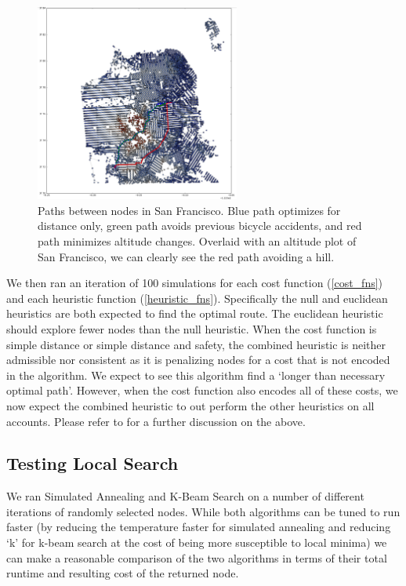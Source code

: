 \documentclass[11pt]{article}
\begin{document}
\begin{figure}
\center
\includegraphics[width=0.6\textwidth]{../images/sf_new_plot_2.png}
\caption{Paths between nodes in San Francisco. Blue path optimizes for distance only, green path avoids previous bicycle accidents, and red path minimizes altitude changes. Overlaid with an altitude plot of San Francisco, we can clearly see the red path avoiding a hill.}
\label{fig:connected_san_fran}
\end{figure}

\par
We then ran an iteration of 100 simulations for each cost function (\ref{cost_fns}) and each heuristic function (\ref{heuristic_fns}). Specifically the null and euclidean heuristics are both expected to find the optimal route. The euclidean heuristic should explore fewer nodes than the null heuristic. When the cost function is simple distance or simple distance and safety, the combined heuristic is neither admissible nor consistent as it is penalizing nodes for a cost that is not encoded in the algorithm. We expect to see this algorithm find a `longer than necessary optimal path'. However, when the cost function also encodes all of these costs, we now expect the combined heuristic to out perform the other heuristics on all accounts. Please refer to  for a further discussion on the above.

\subsection{Testing Local Search}

We ran Simulated Annealing and K-Beam Search on a number of different iterations of randomly selected nodes. While both algorithms can be tuned to run faster (by reducing the temperature faster for simulated annealing and reducing `k' for k-beam search at the cost of being more susceptible to local minima) we can make a reasonable comparison of the two algorithms in terms of their total runtime and resulting cost of the returned node.
\end{document}
